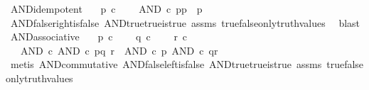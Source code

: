 \begin{isabellebody}
\endisatagproof
{\isafoldproof}%
%
\isadelimproof
\isanewline
%
\endisadelimproof
\isanewline
{}\isamarkupfalse%
\ AND{\isacharunderscore}{\kern0pt}idempotent{\isacharcolon}{\kern0pt}\isanewline
\ \ \ {\isachardoublequoteopen}p\ {\isasymin}\isactrlsub c\ {\isasymOmega}{\isachardoublequoteclose}\isanewline
\ \ \ {\isachardoublequoteopen}AND\ {\isasymcirc}\isactrlsub c\ {\isasymlangle}p{\isacharcomma}{\kern0pt}p{\isasymrangle}\ {\isacharequal}{\kern0pt}\ p{\isachardoublequoteclose}\isanewline
%
\isadelimproof
\ \ %
\endisadelimproof
%
\isatagproof
{}\isamarkupfalse%
\ AND{\isacharunderscore}{\kern0pt}false{\isacharunderscore}{\kern0pt}right{\isacharunderscore}{\kern0pt}is{\isacharunderscore}{\kern0pt}false\ AND{\isacharunderscore}{\kern0pt}true{\isacharunderscore}{\kern0pt}true{\isacharunderscore}{\kern0pt}is{\isacharunderscore}{\kern0pt}true\ assms\ true{\isacharunderscore}{\kern0pt}false{\isacharunderscore}{\kern0pt}only{\isacharunderscore}{\kern0pt}truth{\isacharunderscore}{\kern0pt}values\ \isamarkupfalse%
\ blast%
\endisatagproof
{\isafoldproof}%
%
\isadelimproof
\isanewline
%
\endisadelimproof
\isanewline
{}\isamarkupfalse%
\ AND{\isacharunderscore}{\kern0pt}associative{\isacharcolon}{\kern0pt}\isanewline
\ \ \ {\isachardoublequoteopen}p\ {\isasymin}\isactrlsub c\ {\isasymOmega}{\isachardoublequoteclose}\isanewline
\ \ \ {\isachardoublequoteopen}q\ {\isasymin}\isactrlsub c\ {\isasymOmega}{\isachardoublequoteclose}\isanewline
\ \ \ {\isachardoublequoteopen}r\ {\isasymin}\isactrlsub c\ {\isasymOmega}{\isachardoublequoteclose}\isanewline
\ \ \ {\isachardoublequoteopen}AND\ {\isasymcirc}\isactrlsub c\ {\isasymlangle}AND\ {\isasymcirc}\isactrlsub c\ {\isasymlangle}p{\isacharcomma}{\kern0pt}q{\isasymrangle}{\isacharcomma}{\kern0pt}\ r{\isasymrangle}\ {\isacharequal}{\kern0pt}\ AND\ {\isasymcirc}\isactrlsub c\ {\isasymlangle}p{\isacharcomma}{\kern0pt}\ AND\ {\isasymcirc}\isactrlsub c\ {\isasymlangle}q{\isacharcomma}{\kern0pt}r{\isasymrangle}{\isasymrangle}{\isachardoublequoteclose}\isanewline
%
\isadelimproof
\ \ %
\endisadelimproof
%
\isatagproof
{}\isamarkupfalse%
\ {\isacharparenleft}{\kern0pt}metis\ AND{\isacharunderscore}{\kern0pt}commutative\ AND{\isacharunderscore}{\kern0pt}false{\isacharunderscore}{\kern0pt}left{\isacharunderscore}{\kern0pt}is{\isacharunderscore}{\kern0pt}false\ AND{\isacharunderscore}{\kern0pt}true{\isacharunderscore}{\kern0pt}true{\isacharunderscore}{\kern0pt}is{\isacharunderscore}{\kern0pt}true\ assms\ true{\isacharunderscore}{\kern0pt}false{\isacharunderscore}{\kern0pt}only{\isacharunderscore}{\kern0pt}truth{\isacharunderscore}{\kern0pt}values{\isacharparenright}{\kern0pt}%

\end{isabellebody}
